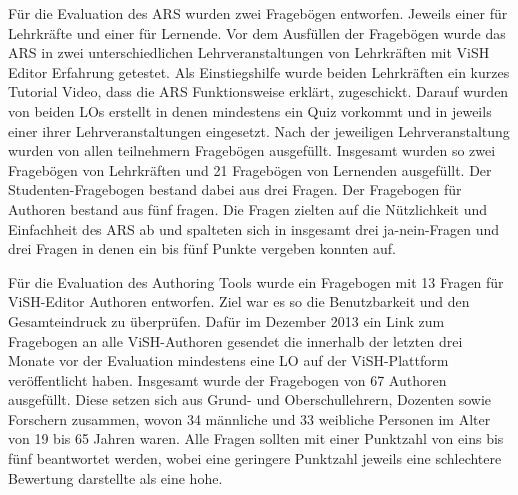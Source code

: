 \documentclass[conference]{IEEEtran}
\begin{document}
Für die Evaluation des ARS wurden zwei Fragebögen entworfen. Jeweils einer für Lehrkräfte und einer für Lernende. Vor dem Ausfüllen der Fragebögen wurde das ARS in zwei unterschiedlichen Lehrveranstaltungen von Lehrkräften mit ViSH Editor Erfahrung getestet. Als Einstiegshilfe wurde beiden Lehrkräften ein kurzes Tutorial Video, dass die ARS Funktionsweise erklärt, zugeschickt. Darauf wurden von beiden LOs erstellt in denen mindestens ein Quiz vorkommt und in jeweils einer ihrer Lehrveranstaltungen eingesetzt. Nach der jeweiligen Lehrveranstaltung wurden von allen teilnehmern Fragebögen ausgefüllt. Insgesamt wurden so zwei Fragebögen von Lehrkräften und 21 Fragebögen von Lernenden ausgefüllt. Der Studenten-Fragebogen bestand dabei aus drei Fragen. Der Fragebogen für Authoren bestand aus fünf fragen. Die Fragen zielten auf die Nützlichkeit und Einfachheit des ARS ab und spalteten sich in insgesamt drei ja-nein-Fragen und drei Fragen in denen ein bis fünf Punkte vergeben konnten auf. \cite[p. 7]{Gordillo2015}

Für die Evaluation des Authoring Tools wurde ein Fragebogen mit 13 Fragen für ViSH-Editor Authoren entworfen. Ziel war es so die Benutzbarkeit und den Gesamteindruck zu überprüfen. Dafür im Dezember 2013 ein Link zum Fragebogen an alle ViSH-Authoren gesendet die innerhalb der letzten drei Monate vor der Evaluation mindestens eine LO auf der ViSH-Plattform veröffentlicht haben. Insgesamt wurde der Fragebogen von 67 Authoren ausgefüllt. Diese setzen sich aus Grund- und Oberschullehrern, Dozenten sowie Forschern zusammen, wovon 34 männliche und 33 weibliche Personen im Alter von 19 bis 65 Jahren waren. Alle Fragen sollten mit einer Punktzahl von eins bis fünf beantwortet werden, wobei eine geringere Punktzahl jeweils eine schlechtere Bewertung darstellte als eine hohe. \cite[p. 5]{Gordillo2015}
\end{document}
